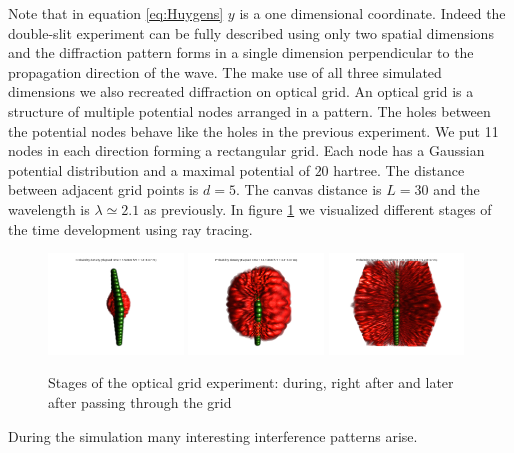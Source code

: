 Note that in equation \ref{eq:Huygens} $y$ is a one dimensional coordinate. Indeed the double-slit experiment can be fully described using only two spatial dimensions and the diffraction pattern forms in a single dimension perpendicular to the propagation direction of the wave.
The make use of all three simulated dimensions we also recreated diffraction on optical grid.
An optical grid is a structure of multiple potential nodes arranged in a pattern.
The holes between the potential nodes behave like the holes in the previous experiment.
We put 11 nodes in each direction forming a rectangular grid.
Each node has a Gaussian potential distribution and a maximal potential of $20$ hartree.
The distance between adjacent grid points is $d = 5$.
The canvas distance is $L=30$ and the wavelength is $\lambda\simeq 2.1$ as previously.
In figure \ref{fig:optical_grid_stages} we visualized different stages of the time development using ray tracing.
\begin{figure}
	\begin{center}
		\includegraphics[width=0.32\textwidth]{figures/optical_grid_01.png}
		\includegraphics[width=0.32\textwidth]{figures/optical_grid_02.png}
		\includegraphics[width=0.32\textwidth]{figures/optical_grid_03.png}
		\caption{Stages of the optical grid experiment: during, right after and later after passing through the grid}
		\label{fig:optical_grid_stages}
	\end{center}	
\end{figure}
During the simulation many interesting interference patterns arise.

